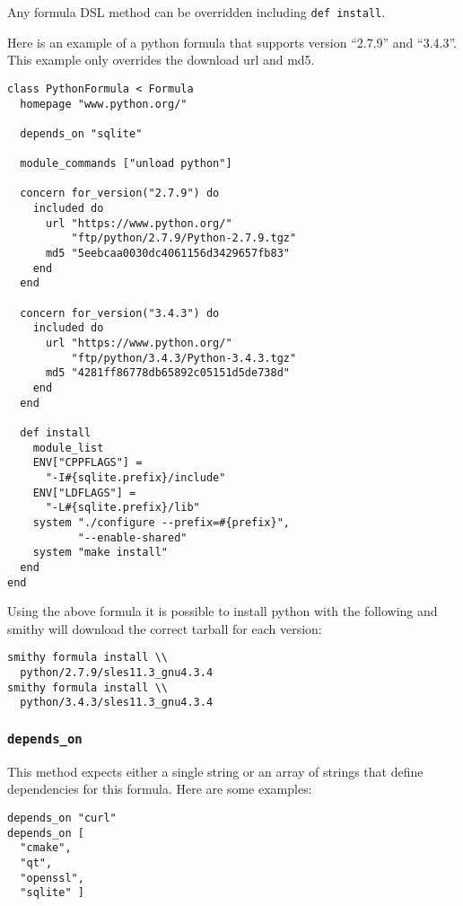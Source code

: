\documentclass{acm_proc_article-sp}
\begin{document}
Any formula DSL method can be overridden including \texttt{def install}.

Here is an example of a python formula that supports version ``2.7.9'' and
``3.4.3''. This example only overrides the download url and md5.

\begin{quoting}
\begin{verbatim}
class PythonFormula < Formula
  homepage "www.python.org/"

  depends_on "sqlite"

  module_commands ["unload python"]

  concern for_version("2.7.9") do
    included do
      url "https://www.python.org/"
          "ftp/python/2.7.9/Python-2.7.9.tgz"
      md5 "5eebcaa0030dc4061156d3429657fb83"
    end
  end

  concern for_version("3.4.3") do
    included do
      url "https://www.python.org/"
          "ftp/python/3.4.3/Python-3.4.3.tgz"
      md5 "4281ff86778db65892c05151d5de738d"
    end
  end

  def install
    module_list
    ENV["CPPFLAGS"] =
      "-I#{sqlite.prefix}/include"
    ENV["LDFLAGS"] =
      "-L#{sqlite.prefix}/lib"
    system "./configure --prefix=#{prefix}",
           "--enable-shared"
    system "make install"
  end
end
\end{verbatim}
\end{quoting}

Using the above formula it is possible to install python with the following and
smithy will download the correct tarball for each version:

\begin{quoting}
\begin{verbatim}
smithy formula install \\
  python/2.7.9/sles11.3_gnu4.3.4
smithy formula install \\
  python/3.4.3/sles11.3_gnu4.3.4
\end{verbatim}
\end{quoting}

\subsubsection{\texttt{depends\_on}}

This method expects either a single string or an array of strings that define
dependencies for this formula. Here are some examples:

\begin{quoting}
\begin{verbatim}
depends_on "curl"
depends_on [
  "cmake",
  "qt",
  "openssl",
  "sqlite" ]
\end{verbatim}
\end{quoting}
\end{document}

